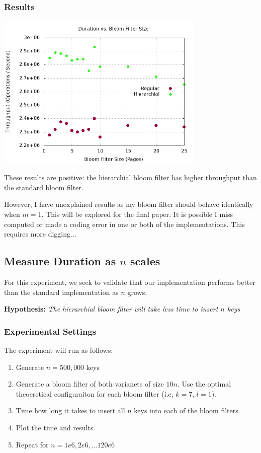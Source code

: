 \documentclass[a4paper]{article}
\theoremstyle{plain}
\theoremstyle{definition}
\begin{document}
	\subsubsection{Results}
	\begin{center}
		\includegraphics[width=10cm]{../plots/scale-m.png}
	\end{center}

	These results are positive: the hierarchial bloom filter has higher throughput than the standard bloom filter.

	However, I have unexplained results as my bloom filter should behave identically when $m=1$. This will be explored for the final paper.
	It is possible I miss computed or made a coding error in one or both of the implementations. This requires more digging...
	\subsection{Measure Duration as $n$ scales}

	For this experiment, we seek to validate that our implementation performs better than the standard implementation as $n$ grows.
	
	\textbf{Hypothesis:} \textit{The hierarchial bloom filter will take less time to insert $n$ keys}

	\subsubsection{Experimental Settings}
	
	The experiment will run as follows:
 	\begin{enumerate}
		\item Generate $n = 500,000$ keys
		\item Generate a bloom filter of both varianets of size $10n$. Use the optimal theoeretical configuraiton for each bloom filter (i.e, $k=7$, $l=1$).
		\item Time how long it takes to insert all $n$ keys into each of the bloom filters.
		\item Plot the time and results.
		\item Repeat for $n = 1e6, 2e6, \ldots 120e6$
	\end{enumerate}
\end{document}
